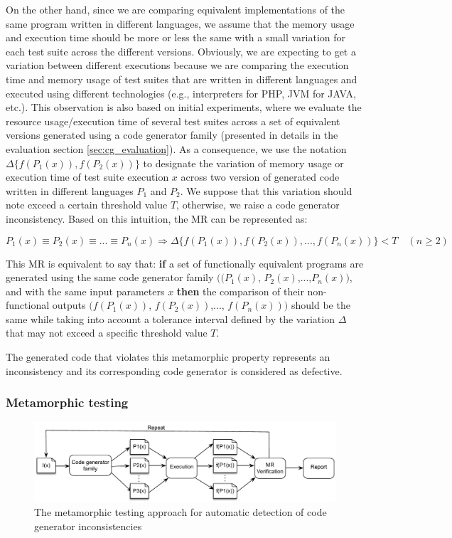 On the other hand, since we are comparing equivalent implementations of the same program written in different languages, we assume that the memory usage and execution time should be more or less the same with a small variation for each test suite across the different versions. Obviously, we are expecting to get a variation between different executions because we are comparing the execution time and memory usage of test suites that are written in different languages and executed using different technologies (e.g., interpreters for PHP, JVM for JAVA, etc.). 
This observation is also based on initial experiments, where we evaluate the resource usage/execution time of several test suites across a set of equivalent versions generated using a code generator family (presented in details in the evaluation section \ref{sec:cg_evaluation}). As a consequence, we use the notation $\Delta\{f(P_{1}(x)), f(P_{2}(x))\}$ to designate the variation of memory usage or execution time of test suite execution $x$ across two version of generated code written in different languages $P_{1}$ and $P_{2}$. We suppose that this variation should note exceed a certain threshold value $T$, otherwise, we raise a code generator inconsistency.
Based on this intuition, the MR can be represented as:

\begin{equation}
P_{1}(x) \equiv P_{2}(x) \equiv ... \equiv P_{n}(x) \Rightarrow \Delta\{f(P_{1}(x)), f(P_{2}(x)),..., f(P_{n}(x))\} < T\quad (n\geqslant 2)
\end{equation}

This MR is equivalent to say that: \textbf{if} a set of functionally equivalent programs are generated using the same code generator family $((P_{1}(x)$, $P_{2}(x)$,...,$P_{n}(x))$, and with the same input parameters $x$ \textbf{then} the comparison of their non-functional outputs $(f(P_{1}(x))$, $f(P_{2}(x))$,..., $f(P_{n}(x)))$ should be the same while taking into account a tolerance interval defined by the variation $\Delta$ that may not exceed a specific threshold value $T$.

The generated code that violates this metamorphic property represents an inconsistency and its corresponding code generator is considered as defective.

 



\subsubsection[(Steps 2, 3, and 4)]{Metamorphic testing}
\begin{figure}[h]
	\centering
	\includegraphics[width=1.\linewidth]{chapitre4/fig/MT}
	\caption{The metamorphic testing approach for automatic detection of code generator inconsistencies}
	\label{fig:cg_MT}
\end{figure}

